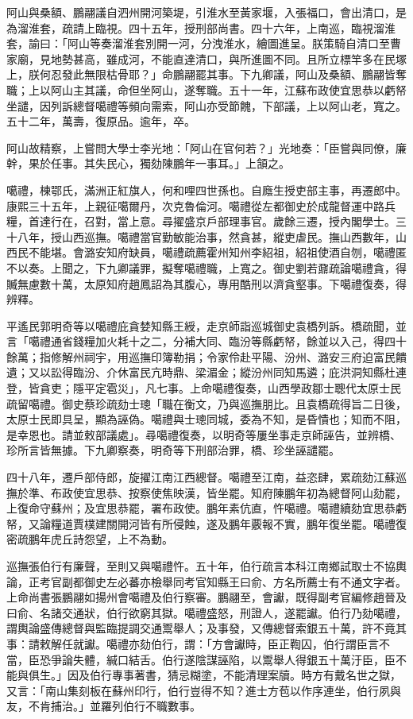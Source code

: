 \begin{pinyinscope}
阿山與桑額、鵬翮議自泗州開河築堤，引淮水至黃家堰，入張福口，會出清口，是為溜淮套，疏請上臨視。四十五年，授刑部尚書。四十六年，上南巡，臨視溜淮套，諭曰：「阿山等奏溜淮套別開一河，分洩淮水，繪圖進呈。朕策騎自清口至曹家廟，見地勢甚高，雖成河，不能直達清口，與所進圖不同。且所立標竿多在民塚上，朕何忍發此無限枯骨耶？」命鵬翮罷其事。下九卿議，阿山及桑額、鵬翮皆奪職；上以阿山主其議，命但坐阿山，遂奪職。五十一年，江蘇布政使宜思恭以虧帑坐譴，因列訴總督噶禮等頻向需索，阿山亦受節餽，下部議，上以阿山老，寬之。五十二年，萬壽，復原品。逾年，卒。

阿山故精察，上嘗問大學士李光地：「阿山在官何若？」光地奏：「臣嘗與同僚，廉幹，果於任事。其失民心，獨劾陳鵬年一事耳。」上頷之。

噶禮，棟鄂氏，滿洲正紅旗人，何和哩四世孫也。自廕生授吏部主事，再遷郎中。康熙三十五年，上親征噶爾丹，次克魯倫河。噶禮從左都御史於成龍督運中路兵糧，首達行在，召對，當上意。尋擢盛京戶部理事官。歲餘三遷，授內閣學士。三十八年，授山西巡撫。噶禮當官勤敏能治事，然貪甚，縱吏虐民。撫山西數年，山西民不能堪。會潞安知府缺員，噶禮疏薦霍州知州李紹祖，紹祖使酒自刎，噶禮匿不以奏。上聞之，下九卿議罪，擬奪噶禮職，上寬之。御史劉若鼐疏論噶禮貪，得贓無慮數十萬，太原知府趙鳳詔為其腹心，專用酷刑以濟貪壑事。下噶禮復奏，得辨釋。

平遙民郭明奇等以噶禮庇貪婪知縣王綬，走京師詣巡城御史袁橋列訴。橋疏聞，並言「噶禮通省錢糧加火耗十之二，分補大同、臨汾等縣虧帑，餘並以入己，得四十餘萬；指修解州祠宇，用巡撫印簿勒捐；令家伶赴平陽、汾州、潞安三府迫富民饋遺；又以訟得臨汾、介休富民亢時鼎、梁湄金；縱汾州同知馬遴；庇洪洞知縣杜連登，皆貪吏；隱平定雹災」，凡七事。上命噶禮復奏，山西學政鄒士聰代太原士民疏留噶禮。御史蔡珍疏劾士璁「職在衡文，乃與巡撫朋比。且袁橋疏得旨二日後，太原士民即具呈，顯為誣偽。噶禮與士璁同城，委為不知，是昏憒也；知而不阻，是幸恩也。請並敕部議處」。尋噶禮復奏，以明奇等屢坐事走京師誣告，並辨橋、珍所言皆無據。下九卿察奏，明奇等下刑部治罪，橋、珍坐誣譴罷。

四十八年，遷戶部侍郎，旋擢江南江西總督。噶禮至江南，益恣肆，累疏劾江蘇巡撫於準、布政使宜思恭、按察使焦映漢，皆坐罷。知府陳鵬年初為總督阿山劾罷，上復命守蘇州；及宜思恭罷，署布政使。鵬年素伉直，忤噶禮。噶禮續劾宜思恭虧帑，又論糧道賈樸建關開河皆有所侵蝕，遂及鵬年覈報不實，鵬年復坐罷。噶禮復密疏鵬年虎丘詩怨望，上不為動。

巡撫張伯行有廉聲，至則又與噶禮忤。五十年，伯行疏言本科江南鄉試取士不協輿論，正考官副都御史左必蕃亦檢舉同考官知縣王曰俞、方名所薦士有不通文字者。上命尚書張鵬翮如揚州會噶禮及伯行察審。鵬翮至，會讞，既得副考官編修趙晉及曰俞、名諸交通狀，伯行欲窮其獄。噶禮盛怒，刑證人，遂罷讞。伯行乃劾噶禮，謂輿論盛傳總督與監臨提調交通鬻舉人；及事發，又傳總督索銀五十萬，許不竟其事：請敕解任就讞。噶禮亦劾伯行，謂：「方會讞時，臣正鞫囚，伯行謂臣言不當，臣恐爭論失體，緘口結舌。伯行遂陰謀誣陷，以鬻舉人得銀五十萬汙臣，臣不能與俱生。」因及伯行專事著書，猜忌糊塗，不能清理案牘。時方有戴名世之獄，又言：「南山集刻板在蘇州印行，伯行豈得不知？進士方苞以作序連坐，伯行夙與友，不肯捕治。」並羅列伯行不職數事。


\end{pinyinscope}
